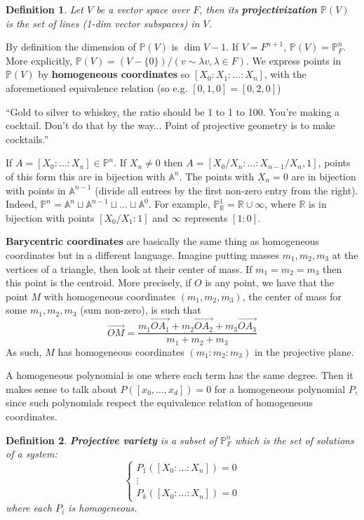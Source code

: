 \documentclass[12pt]{article}
\newcommand{\R}{\mathbb{R}}
\renewcommand{\P}{\mathbb{P}}
\newcommand{\A}{\mathbb{A}}
\renewcommand{\vec}{\overrightarrow}
\newtheorem{definition}{Definition}[section]
\begin{document}
    \begin{definition}
        Let $V$ be a vector space over $F$, then its \textbf{projectivization} $\P(V)$ is the set of lines (1-dim vector subspaces) in $V$. 
    \end{definition}
    By definition the dimension of $\P(V)$ is $\dim V - 1$. If $V = F^{n+1}$, $\P(V) = \P_F^n$. More explicitly, $\P(V) = (V - \{0\})/(v \sim \lambda v, \lambda \in F)$. 
    We express points in $\P(V)$ by \textbf{homogeneous coordinates} so $[X_0: X_1 : \dots : X_n]$, with the aforemetioned equivalence relation (so e.g. $[0, 1, 0] = [0, 2, 0]$) \par 
    ``Gold to silver to whiskey, the ratio should be 1 to 1 to 100. You're making a cocktail. Don't do that by the way... Point of projective geometry is to make cocktails.''\par 
    If $A = [X_0: \dots :X_n] \in \P^n$. If $X_n \neq 0$ then $A = [X_0/X_n: \dots : X_{n-1}/X_n, 1]$, points of this form this are in bijection with $\A^n$. The points with $X_n = 0$ are in bijection with points in $\A^{n-1}$ (divide all entrees by the first non-zero entry from the right). Indeed, $\P^n = \A^n \sqcup \A^{n-1} \sqcup \dots \sqcup \A^0$. For example, $\P_\R^1 = \R \cup \infty$, where $\R$ is in bijection with points $[X_0/X_1:1]$ and $\infty$ represents $[1:0]$.  \par 
    \textbf{Barycentric coordinates} are basically the same thing as homogeneous coordinates but in a different language. Imagine putting masses $m_1, m_2, m_3$ at the vertices of a triangle, then look at their center of mass. If $m_1 = m_2 = m_3$ then this point is the centroid. More precisely, if $O$ is any point, we have that the point $M$ with homogeneous coordinates $(m_1, m_2, m_3)$, the center of mass for some $m_1, m_2, m_3$ (sum non-zero), is such that
    $$\vec{OM} = \frac{m_1\vec{OA_1} + m_2\vec{OA_2} + m_3\vec{OA_3}}{m_1 + m_2 + m_3}$$
    As such, $M$ has homogeneous coordinates $(m_1:m_2:m_3)$ in the projective plane.  \par 
    A homogeneous polynomial is one where each term has the same degree. Then it makes sense to talk about $P([x_0, \dots, x_d]) = 0$ for a homogeneous polynomial $P$, since such polynomials respect the equivalence relation of homogeneous coordinates. 
    \begin{definition}
        \textbf{Projective variety} is a subset of $\P_F^n$ which is the set of solutions of a system:
        $$\begin{cases}
            P_1([X_0: \dots : X_n]) = 0 \\ 
            \vdots \\
            P_k([X_0: \dots : X_n]) = 0
        \end{cases}$$
        where each $P_i$ is homogeneous. 
    \end{definition}
\end{document}
